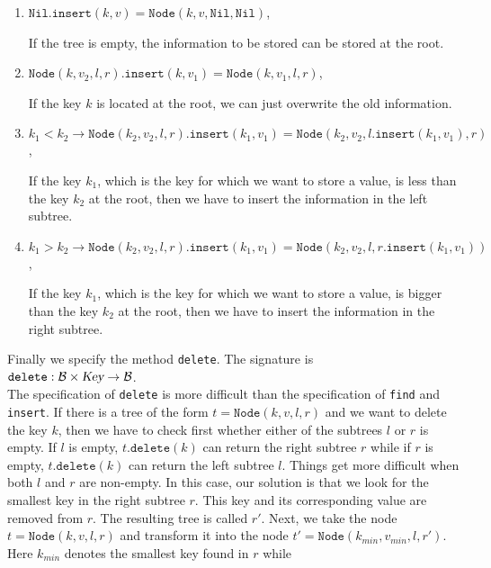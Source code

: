\begin{enumerate}
\item $\texttt{Nil}.\texttt{insert}(k,v) = \texttt{Node}(k,v, \texttt{Nil}, \texttt{Nil})$,
  
      If the tree is empty, the information to be stored can be stored at the root.
\item $\texttt{Node}(k,v_2,l,r).\texttt{insert}(k,v_1) = \texttt{Node}(k, v_1, l, r)$,

      If the key $k$ is located at the root, we can just overwrite the old information. 
\item $k_1 < k_2 \rightarrow 
         \texttt{Node}(k_2, v_2, l, r).\texttt{insert}(k_1, v_1) = \texttt{Node}(k_2, v_2, l.\texttt{insert}(k_1, v_1), r)$,

      If the key $k_1$, which is the key for which we want to store a value, is less than the key
      $k_2$ at the root, then we have to insert the information in the left subtree.
\item $k_1 > k_2 \rightarrow 
         \texttt{Node}(k_2, v_2, l, r).\texttt{insert}(k_1, v_1) = 
         \texttt{Node}(k_2, v_2, l, r.\texttt{insert}(k_1, v_1))$,

      If the key $k_1$, which is the key for which we want to store a value, is bigger than the key
      $k_2$ at the root, then we have to insert the information in the right subtree.
\end{enumerate}
Finally we specify the method  \texttt{delete}.  The signature is
\\[0.2cm]
\hspace*{1.3cm}
$\texttt{delete}: \mathcal{B} \times \textsl{Key} \rightarrow \mathcal{B}$.
\\[0.2cm]
The specification of \texttt{delete} is more
difficult than the specification of \texttt{find} and \texttt{insert}.
If there is a tree of the form $t =\texttt{Node}(k,v,l,r)$ and we want to delete the key $k$, then
we have to check first whether either of the subtrees  $l$ or $r$ is empty.  If $l$ is empty,
$t.\texttt{delete}(k)$ can return the right subtree  $r$ while if $r$ is empty,
$t.\texttt{delete}(k)$ can return the left subtree $l$.
Things get more difficult when both $l$ and $r$ are non-empty.  In this case,
our solution is that we look for the smallest key in the right subtree $r$.
This key and its corresponding value are removed from $r$.  The resulting tree is called $r'$.
Next, we take the node $t =\texttt{Node}(k,v,l,r)$ and transform it into the node
$t'=\texttt{Node}(k_{min},v_{min},l,r')$.  Here $k_{min}$ denotes the smallest key found in $r$ while
